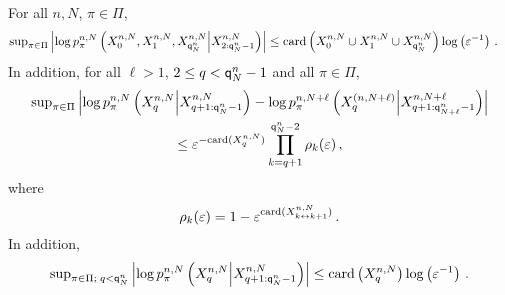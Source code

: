 \begin{lemma}
\label{lem:exp:forget}
For all $n,N$, $\pi\in\Pi$,
\begin{align}
\mathrm{sup}_{\pi\in\Pi}\left|\log p_{\pi}^{n,N}\left(X_{0}^{n,N},X_{1}^{n,N},X_{{\mathsf{q}}^{n}_{N}}^{n,N}\middle|X_{2:{\mathsf{q}}^{n}_{N}-1}^{n,N}\right)\right|&\le \mathrm{card}\left(X_{0}^{n,N}\cup X_{1}^{n,N}\cup X_{{\mathsf{q}}^{n}_{N}}^{n,N}\right)\log \left(\varepsilon^{-1}\right)\label{eq:bound:end}\,.
\end{align}
In addition,  for all $\ell>1$,  $2\le q< {\mathsf{q}}^{n}_{N}-1$ and all $\pi\in\Pi$,
\begin{multline}
\mathrm{sup}_{\pi\in\Pi}\left|\log p_{\pi}^{n,N}\left(X_{q}^{n,N}\middle|X_{q+1:{\mathsf{q}}^{n}_{N}-1}^{n,N}\right) - \log p_{\pi}^{n,N+\ell}\left(X_{q}^{(n,N+\ell)}\middle|X_{q+1:{\mathsf{q}}^{n}_{N+\ell}-1}^{n,N+\ell}\right) \right|\\
\leq \varepsilon^{-\mathrm{card}(X^{n,N}_{q})}\prod_{k=q+1}^{{\mathsf{q}}^{n}_{N}-2}\rho_k(\varepsilon) \,,\label{eq:bound:forget}
\end{multline}
where
\begin{equation}
\label{eq:defrho}
\rho_k(\varepsilon) = 1- \varepsilon^{\mathrm{card}(X^{n,N}_{k\leftrightarrow k+1})}\,.
\end{equation}
In addition,
\begin{equation}
\label{eq:bound:loglik}
\mathrm{sup}_{\pi\in\Pi;\;q< {\mathsf{q}}^{n}_{N}}\left|\log p_{\pi}^{n,N}\left(X_{q}^{n,N}\middle|X_{q+1:{\mathsf{q}}^{n}_{N}-1}^{n,N}\right)\right|\le \mathrm{card}\left(X_{q}^{n,N}\right)\log \left(\varepsilon^{-1}\right)\,. 
\end{equation}
\end{lemma}

